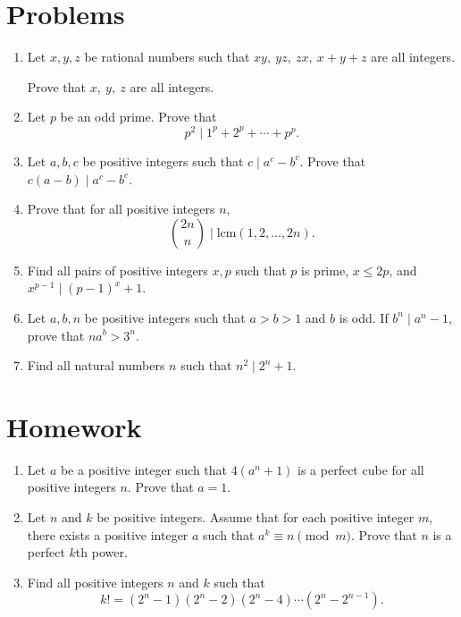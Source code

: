 \documentclass{article}
\newcommand\lcm{\mathrm{lcm}}
\begin{document}
\section{Problems}
\begin{enumerate}
	\item Let $x,y,z$ be rational numbers such that $xy,\ yz,\ zx,\ x+y+z$ are all
	      integers.

	      Prove that $x,\ y,\ z$ are all integers.
	\item Let $p$ be an odd prime. Prove that
	      \[p^2\mid 1^p+2^p+\cdots+p^p.\]
	\item Let $a,b,c$ be positive integers such that $c\mid a^c-b^c$. Prove that
	      $c(a-b)\mid a^c-b^c$.
	\item Prove that for all positive integers $n$,
	      \[\binom{2n}n\mid\lcm(1,2,\ldots,2n).\]
	\item Find all pairs of positive integers $x,p$ such that $p$ is prime, $x\le
		      2p$, and $x^{p-1}\mid (p-1)^x+1$.
	\item Let $a,b,n$ be positive integers such that $a>b>1$ and $b$ is odd. If
	      $b^n\mid a^n-1$, prove that $na^b>3^n$.
	\item Find all natural numbers $n$ such that $n^2\mid 2^n+1$.
\end{enumerate}
\newpage
\section{Homework}
\begin{enumerate}
	\item Let $a$ be a positive integer such that $4(a^n+1)$ is a perfect
	      cube for all positive integers $n$. Prove that $a=1$.
	\item Let $n$ and $k$ be positive integers. Assume that for each positive
	      integer $m$, there exists a positive integer $a$ such that $a^k\equiv
		      n\pmod m$. Prove that $n$ is a perfect $k$th power.
	\item Find all positive integers $n$ and $k$ such that
	      \[k!=(2^n-1)(2^n-2)(2^n-4)\cdots(2^n-2^{n-1}).\]
\end{enumerate}
\end{document}
